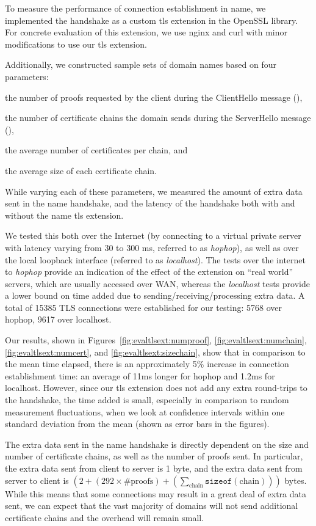 To measure the performance of connection establishment in \ac{name}, we
implemented the handshake as a custom \ac{tls} extension in the OpenSSL library.
For concrete evaluation of this extension, we use nginx and curl with minor
modifications to use our \ac{tls} extension.

Additionally, we constructed sample sets of domain names based on four parameters:
\begin{inparaenum}
\item the number of proofs requested by the client during the
  ClientHello message (\numlas),
\item the number of certificate chains the domain sends during the ServerHello
  message (\policy),
\item the average number of certificates per chain, and
\item the average size of each certificate chain.
\end{inparaenum}
While varying each of these parameters, we measured the amount of extra data
sent in the \ac{name} handshake, and the latency of the handshake both with and
without the \ac{name} \ac{tls} extension.

We tested this both over the Internet (by connecting to a virtual private server
with latency varying from 30 to 300 ms, referred to as \emph{hophop}), as well
as over the local loopback interface (referred to as \emph{localhost}). The
tests over the internet to \emph{hophop} provide an indication of the effect of
the extension on ``real world'' servers, which are usually accessed over WAN,
whereas the \emph{localhost} tests provide a lower bound on time added due to
sending/receiving/processing extra data. A total of 15385 TLS connections were
established for our testing: 5768 over hophop, 9617 over localhost.

Our results, shown in Figures~\ref{fig:evaltlsext:numproof},
\ref{fig:evaltlsext:numchain}, \ref{fig:evaltlsext:numcert}, and
\ref{fig:evaltlsext:sizechain}, show that in comparison to the mean time
elapsed, there is an approximately 5\% increase in connection establishment
time: an average of 11ms longer for hophop and 1.2ms for localhost. However,
since our \ac{tls} extension does not add any extra round-trips to the
handshake, the time added is small, especially in comparison to random
measurement fluctuations, when we look at confidence intervals within one
standard deviation from the mean (shown as error bars in the figures).

The extra data sent in the \ac{name} handshake is directly dependent on the size
and number of certificate chains, as well as the number of proofs sent. In
particular, the extra data sent from client to server is 1 byte, and the extra
data sent from server to client is
$(2 + (292 \times \text{\#proofs}) +
(\sum_{\text{chain}}\texttt{sizeof}(\text{chain})))$ bytes. While this means
that some connections may result in a great deal of extra data sent, we can
expect that the vast majority of domains will not send additional certificate
chains and the overhead will remain small.
